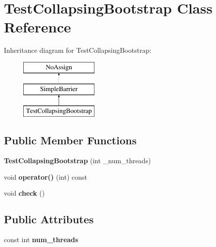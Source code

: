 \hypertarget{classTestCollapsingBootstrap}{}\section{Test\+Collapsing\+Bootstrap Class Reference}
\label{classTestCollapsingBootstrap}
Inheritance diagram for Test\+Collapsing\+Bootstrap\+:\begin{figure}[H]
\begin{center}
\leavevmode
\includegraphics[height=3.000000cm]{classTestCollapsingBootstrap}
\end{center}
\end{figure}
\subsection*{Public Member Functions}
\begin{DoxyCompactItemize}
\item 
\hypertarget{classTestCollapsingBootstrap_ad246271c3bf12b9234002436db566064}{}{\bfseries Test\+Collapsing\+Bootstrap} (int \+\_\+num\+\_\+threads)\label{classTestCollapsingBootstrap_ad246271c3bf12b9234002436db566064}

\item 
\hypertarget{classTestCollapsingBootstrap_ae585f8447f20178d6fa11eddc470520c}{}void {\bfseries operator()} (int) const \label{classTestCollapsingBootstrap_ae585f8447f20178d6fa11eddc470520c}

\item 
\hypertarget{classTestCollapsingBootstrap_a36735f1f7ea716cd4b5551fc3ac7eb75}{}void {\bfseries check} ()\label{classTestCollapsingBootstrap_a36735f1f7ea716cd4b5551fc3ac7eb75}

\end{DoxyCompactItemize}
\subsection*{Public Attributes}
\begin{DoxyCompactItemize}
\item 
\hypertarget{classTestCollapsingBootstrap_a8326ed86568c2ba33cce72b3d488129e}{}const int {\bfseries num\+\_\+threads}\label{classTestCollapsingBootstrap_a8326ed86568c2ba33cce72b3d488129e}

\end{DoxyCompactItemize}
